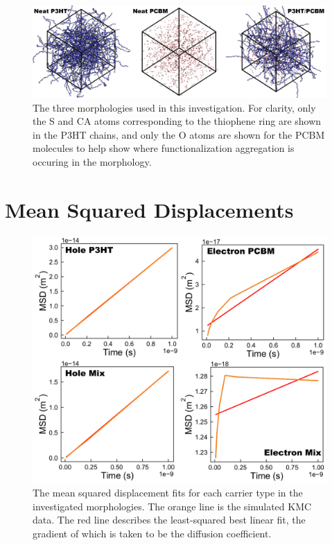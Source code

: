 \documentclass[12pt]{article}
\begin{document}
\begin{figure}[h!]\centering
	\includegraphics[width=\textwidth]{Figures/morphologies.png}
    \caption{The three morphologies used in this investigation. 
    For clarity, only the S and CA atoms corresponding to the thiophene ring are shown in the P3HT chains, and only the O atoms are shown for the PCBM molecules to help show where functionalization aggregation is occuring in the morphology.}
	\label{fig:morphologies}
\end{figure}


\section{Mean Squared Displacements}


\begin{figure}[h!]\centering
	\includegraphics[width=\textwidth]{Figures/MSD.pdf}
    \caption{The mean squared displacement fits for each carrier type in the investigated morphologies.
    The orange line is the simulated KMC data.
    The red line describes the least-squared best linear fit, the gradient of which is taken to be the diffusion coefficient.}
	\label{fig:MSD}
\end{figure}
\end{document}
